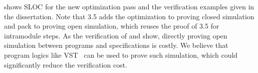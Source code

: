  shows SLOC for the new optimization pass and the verification examples
given in the dissertation.  Note that  3.5 adds the optimization to \ccr{} proving closed simulation
and  pack to \ccm{} proving open simulation, which reuses the proof of  3.5 for intramodule steps.
As the verification of  and  show, directly proving
open simulation between programs and specifications is costly. 
We believe that program logics like VST~\cite{VST} can be used to prove such simulation,
which could significantly reduce the verification cost.










